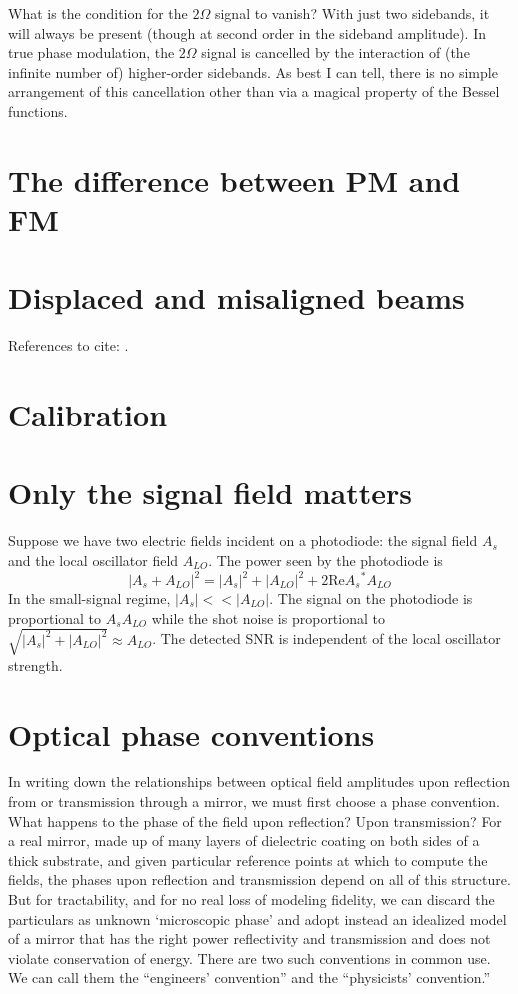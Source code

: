What is the condition for the $2\Omega$ signal to vanish? With just
two sidebands, it will always be present (though at second order in
the sideband amplitude). In true phase modulation, the $2\Omega$
signal is cancelled by the interaction of (the infinite number of)
higher-order sidebands. As best I can tell, there is no simple
arrangement of this cancellation other than via a magical property of
the Bessel functions.

\section{The difference between PM and FM}


\section{Displaced and misaligned beams}

References to cite: \cite{Anderson1984Alignment,Hauck1980Misalignment}.

\section{Calibration}
\cite{KisselCalibrationPaper,Goetz2010Gravitational}

\section{Only the signal field matters}

Suppose we have two electric fields incident on a photodiode: the
signal field $A_s$ and the local oscillator field $A_{LO}$.  The power
seen by the photodiode is
$$ \left| A_s + A_{LO} \right|^2 = 
   |A_s|^2 + |A_{LO}|^2 + 2 \mathrm{ Re } {A_s}^*A_{LO}$$
In the small-signal regime, $|A_s| << |A_{LO}|$.  The signal on the
photodiode is proportional to $A_s A_{LO}$ while the shot noise is
proportional to $\sqrt{|A_s|^2+|A_{LO}|^2}\approx A_{LO}$.  
  The detected SNR is independent of the local oscillator strength.

\section{Optical phase conventions}

In writing down the relationships between optical field amplitudes
upon reflection from or transmission through a mirror, we must first
choose a phase convention. What happens to the phase of the field upon
reflection? Upon transmission? For a real mirror, made up of many
layers of dielectric coating on both sides of a thick substrate, and
given particular reference points at which to compute the fields, the
phases upon reflection and transmission depend on all of this
structure. But for tractability, and for no real loss of modeling
fidelity, we can discard the particulars as unknown `microscopic
phase' and adopt instead an idealized model of a mirror that has the
right power reflectivity and transmission and does not violate
conservation of energy. There are two such conventions in common
use. We can call them the ``engineers' convention'' and the
``physicists' convention.''


